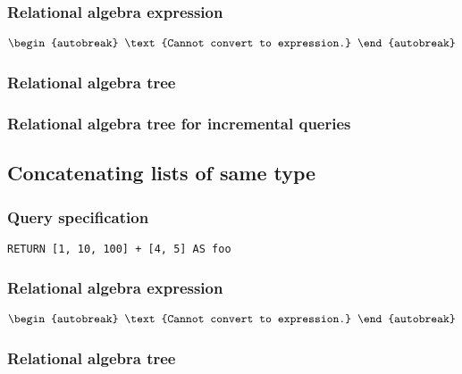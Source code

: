 \subsubsection*{Relational algebra expression}

\begin{align*}
\begin{autobreak}
\text{Cannot convert to expression.}
\end{autobreak}
\end{align*}

\subsubsection*{Relational algebra tree}


\subsubsection*{Relational algebra tree for incremental queries}


\subsection{Concatenating lists of same type}

\subsubsection*{Query specification}

\begin{lstlisting}
RETURN [1, 10, 100] + [4, 5] AS foo
\end{lstlisting}

\subsubsection*{Relational algebra expression}

\begin{align*}
\begin{autobreak}
\text{Cannot convert to expression.}
\end{autobreak}
\end{align*}

\subsubsection*{Relational algebra tree}

